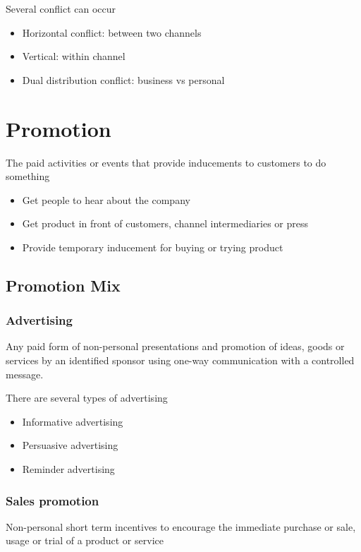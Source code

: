 \documentclass[a4paper,titlepage] {scrartcl}
\begin{document}
Several conflict can occur
\begin{itemize}
	\item Horizontal conflict: between two channels
	\item Vertical: within channel
	\item Dual distribution conflict: business vs personal
\end{itemize}



\section{Promotion} %
\label{sec:promotion}
The paid activities or events that provide inducements to customers to do something
\begin{itemize}
	\item Get people to hear about the company
	\item Get product in front of customers, channel intermediaries or press
	\item Provide temporary inducement for buying or trying product
\end{itemize}

\subsection{Promotion Mix} %
\label{sub:promotion_mix}
\subsubsection{Advertising}	 %
\label{par:advertising}
Any paid form of non-personal presentations and promotion of ideas, goods or services by an identified sponsor using one-way communication with a controlled message.

There are several types of advertising
\begin{itemize}
	\item Informative advertising
	\item Persuasive advertising
	\item Reminder advertising
\end{itemize}

\subsubsection{Sales promotion} %
\label{par:sales_promotion}
Non-personal short term incentives to encourage the immediate purchase or sale, usage or trial of a product or service
\end{document}

